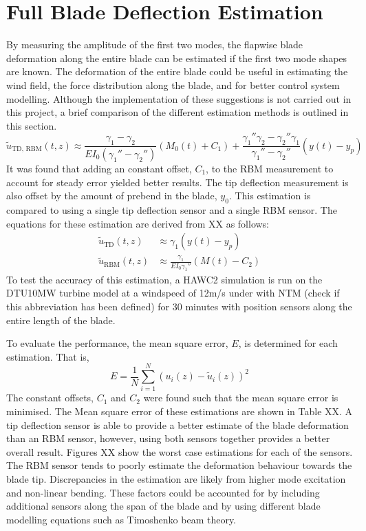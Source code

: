 \section{Full Blade Deflection Estimation}
By measuring the amplitude of the first two modes, the flapwise blade deformation along the entire blade can be estimated if the first two mode shapes are known. The deformation of the entire blade could be useful in estimating the wind field, the force distribution along the blade, and for better control system modelling. Although the implementation of these suggestions is not carried out in this project, a brief comparison of the different estimation methods is outlined in this section.
\begin{equation}
    \tilde{u}_{\text{TD, RBM}}(t, z) \approx \frac{\gamma_1 - \gamma_2}{EI_0(\gamma_1'' - \gamma_2'')}(M_0(t) + C_1) + \frac{\gamma_1''\gamma_2 - \gamma_2''\gamma_1}{\gamma_1'' - \gamma_2''}(y(t) - y_p)
\end{equation}
It was found that adding an constant offset, $C_1$, to the RBM measurement to account for steady error yielded better results. The tip deflection measurement is also offset by the amount of prebend in the blade, $y_0$. This estimation is compared to using a single tip deflection sensor and a single RBM sensor. The equations for these estimation are derived from XX as follows:
\begin{align}
    \tilde{u}_{\text{TD}}(t, z) &\approx \gamma_1(y(t) - y_p) \\
    \tilde{u}_{\text{RBM}}(t, z) &\approx \frac{\gamma_1}{EI_0\gamma_1''}(M(t) - C_2)
\end{align}
To test the accuracy of this estimation, a HAWC2 simulation is run on the DTU10MW turbine model at a windspeed of 12m/s under with NTM (check if this abbreviation has been defined) for 30 minutes with position sensors along the entire length of the blade. 

To evaluate the performance, the mean square error, $E$, is determined for each estimation. That is,
\begin{equation}
    E = \frac{1}{N} \sum_{i=1}^N \left( u_i(z) - \tilde{u}_i(z)\right)^2
\end{equation}
The constant offsets, $C_1$ and $C_2$ were found such that the mean square error is minimised. The Mean square error of these estimations are shown in Table XX. A tip deflection sensor is able to provide a better estimate of the blade deformation than an RBM sensor, however, using both sensors together provides a better overall result. Figures XX show the worst case estimations for each of the sensors. The RBM sensor tends to poorly estimate the deformation behaviour towards the blade tip. Discrepancies in the estimation are likely from higher mode excitation and non-linear bending. These factors could be accounted for by including additional sensors along the span of the blade and by using different blade modelling equations such as Timoshenko beam theory.

